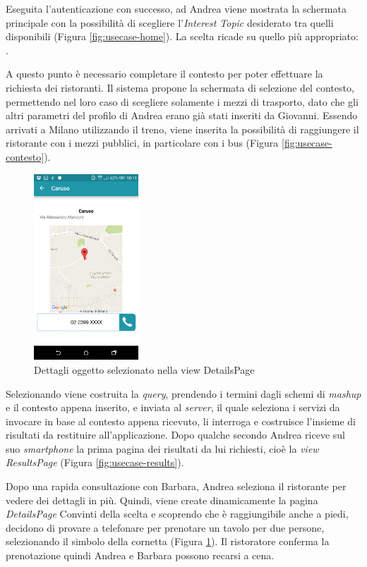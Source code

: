 Eseguita l'autenticazione con successo, ad Andrea viene mostrata la schermata principale con la possibilità di scegliere l'\emph{Interest Topic} desiderato tra quelli disponibili (Figura \ref{fig:usecase-home}). La scelta ricade su quello più appropriato: .

A questo punto è necessario completare il contesto per poter effettuare la richiesta dei ristoranti. Il sistema propone la schermata di selezione del contesto, permettendo nel loro caso di scegliere solamente i mezzi di trasporto, dato che gli altri parametri del profilo di Andrea erano già stati inseriti da Giovanni. Essendo arrivati a Milano utilizzando il treno, viene inserita la possibilità di raggiungere il ristorante con i mezzi pubblici, in particolare con i bus (Figura \ref{fig:usecase-contesto}).

\begin{figure}[ht]
	\centering
	\includegraphics[width=0.35\textwidth]{4-progettazione-alto-livello/Immagini/details_caso_d'uso.png}
	\caption{Dettagli oggetto selezionato nella view DetailsPage}\label{fig:usecase-details}
\end{figure} 

Selezionando  viene costruita la \emph{query}, prendendo i termini dagli schemi di \emph{mashup} e il contesto appena inserito, e inviata al \emph{server}, il quale seleziona i servizi da invocare in base al contesto appena ricevuto, li interroga e costruisce l'insieme di risultati da restituire all'applicazione. Dopo qualche secondo Andrea riceve sul suo \emph{smartphone} la prima pagina dei risultati da lui richiesti, cioè la \textit{view} \emph{ResultsPage} (Figura \ref{fig:usecase-results}).

Dopo una rapida consultazione con Barbara, Andrea seleziona il ristorante  per vedere dei dettagli in più. Quindi, viene create dinamicamente la pagina \emph{DetailsPage} Convinti della scelta e scoprendo che è raggiungibile anche a piedi, decidono di provare a telefonare per prenotare un tavolo per due persone, selezionando il simbolo della cornetta (Figura \ref{fig:usecase-details}). Il ristoratore conferma la prenotazione quindi Andrea e Barbara possono recarsi a cena. %

